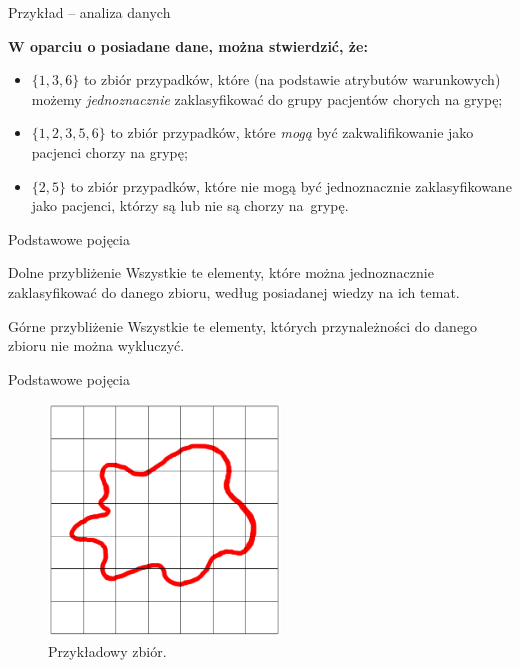 \documentclass[10pt]{beamer}
\begin{document}
\begin{frame}{Przykład -- analiza danych}
\begin{spacing}{1.5}
\textbf{W oparciu o posiadane dane, można stwierdzić, że:}\\
\begin{itemize}
\item $\lbrace 1,3,6 \rbrace$ to zbiór przypadków, które (na podstawie atrybutów warunkowych) możemy \textit{jednoznacznie} zaklasyfikować do grupy pacjentów chorych na grypę;
\item $\lbrace 1,2,3,5,6 \rbrace$ to zbiór przypadków, które \textit{mogą} być zakwalifikowanie jako pacjenci chorzy na grypę;
\item $\lbrace 2,5 \rbrace$ to zbiór przypadków, które nie mogą być jednoznacznie zaklasyfikowane jako pacjenci, którzy są lub nie są chorzy na~grypę.
\end{itemize}
\end{spacing}
\end{frame}


\begin{frame}{Podstawowe pojęcia}
\begin{spacing}{1.2}
\begin{block}{Dolne przybliżenie}
Wszystkie te elementy, które można jednoznacznie zaklasyfikować do danego zbioru, według posiadanej wiedzy na ich temat.
\end{block}
\begin{block}{Górne przybliżenie}
Wszystkie te elementy, których przynależności do danego zbioru nie można wykluczyć.
\end{block}
\end{spacing}
\end{frame}


\begin{frame}{Podstawowe pojęcia}
\begin{center}
\begin{figure}
\includegraphics[width=0.55\textwidth]{Grafiki/plama.png}
\caption{Przykładowy zbiór.}
\end{figure}
\end{center}
\end{frame}
\end{document}

